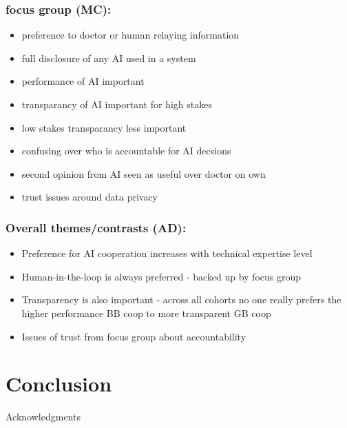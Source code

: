 \documentclass[manuscript,screen,review]{acmart}
\begin{document}
\subsubsection{focus group (MC):}
\begin{itemize}
    \item preference to doctor or human relaying information
    \item full disclosure of any AI used in a system
    \item performance of AI important
    \item transparancy of AI important for high stakes
    \item low stakes transparancy less important
    \item confusing over who is accountable for AI decsions
    \item second opinion from AI seen as useful over doctor on own
    \item trust issues around data privacy
\end{itemize}

\subsubsection{Overall themes/contrasts (AD):}

\begin{itemize}
    \item Preference for AI cooperation increases with technical expertise level
    \item Human-in-the-loop is always preferred - backed up by focus group
    \item Transparency is also important - across all cohorts no one really prefers the higher performance BB coop to more transparent GB coop
    \item Issues of trust from focus group about accountability
\end{itemize}




\section{Conclusion}



\begin{acks}
Acknowledgments
\end{acks}
\end{document}
